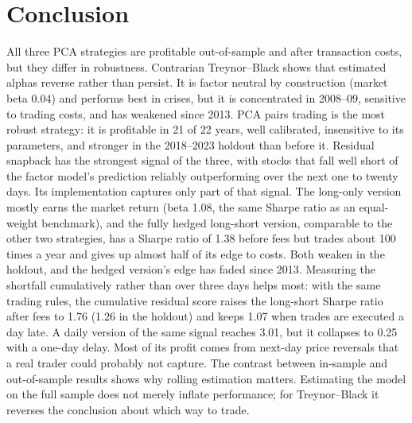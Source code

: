 \documentclass[11pt,letterpaper]{article}
\begin{document}
\section{Conclusion}

All three PCA strategies are profitable out-of-sample and after transaction costs, but they
differ in robustness. Contrarian Treynor--Black shows that estimated alphas reverse rather than
persist. It is factor neutral by construction (market beta 0.04) and performs best in crises,
but it is concentrated in 2008--09, sensitive to trading costs, and has weakened since 2013. PCA
pairs trading is the most robust strategy: it is profitable in 21 of 22 years, well calibrated,
insensitive to its parameters, and stronger in the 2018--2023 holdout than before it. Residual
snapback has the strongest signal of the three, with stocks that fall well short of the factor
model's prediction reliably outperforming over the next one to twenty days. Its implementation
captures only part of that signal. The long-only version mostly earns the market return (beta
1.08, the same Sharpe ratio as an equal-weight benchmark), and the fully hedged long-short
version, comparable to the other two strategies, has a Sharpe ratio of 1.38 before fees but
trades about 100 times a year and gives up almost half of its edge to costs. Both weaken in the
holdout, and the hedged version's edge has faded since 2013. Measuring the shortfall
cumulatively rather than over three days helps most: with the same trading rules, the cumulative
residual score raises the long-short Sharpe ratio after fees to 1.76 (1.26 in the holdout) and
keeps 1.07 when trades are executed a day late. A daily version of the same signal reaches 3.01,
but it collapses to 0.25 with a one-day delay. Most of its profit comes from next-day price
reversals that a real trader could probably not capture. The contrast between in-sample and
out-of-sample results shows why rolling estimation matters. Estimating the model on the full
sample does not merely inflate performance; for Treynor--Black it reverses the conclusion about
which way to trade.
\end{document}

